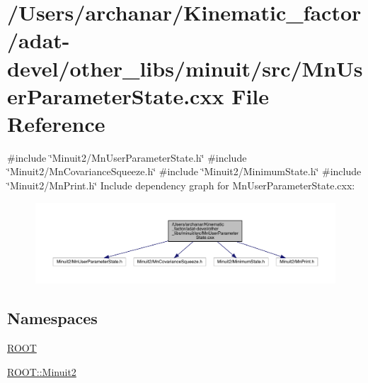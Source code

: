 \hypertarget{adat-devel_2other__libs_2minuit_2src_2MnUserParameterState_8cxx}{}\section{/\+Users/archanar/\+Kinematic\+\_\+factor/adat-\/devel/other\+\_\+libs/minuit/src/\+Mn\+User\+Parameter\+State.cxx File Reference}
\label{adat-devel_2other__libs_2minuit_2src_2MnUserParameterState_8cxx}
{\ttfamily \#include \char`\"{}Minuit2/\+Mn\+User\+Parameter\+State.\+h\char`\"{}}\newline
{\ttfamily \#include \char`\"{}Minuit2/\+Mn\+Covariance\+Squeeze.\+h\char`\"{}}\newline
{\ttfamily \#include \char`\"{}Minuit2/\+Minimum\+State.\+h\char`\"{}}\newline
{\ttfamily \#include \char`\"{}Minuit2/\+Mn\+Print.\+h\char`\"{}}\newline
Include dependency graph for Mn\+User\+Parameter\+State.\+cxx\+:
\nopagebreak
\begin{figure}[H]
\begin{center}
\leavevmode
\includegraphics[width=350pt]{d0/d76/adat-devel_2other__libs_2minuit_2src_2MnUserParameterState_8cxx__incl}
\end{center}
\end{figure}
\subsection*{Namespaces}
\begin{DoxyCompactItemize}
\item 
 \mbox{\hyperlink{namespaceROOT}{R\+O\+OT}}
\item 
 \mbox{\hyperlink{namespaceROOT_1_1Minuit2}{R\+O\+O\+T\+::\+Minuit2}}
\end{DoxyCompactItemize}
